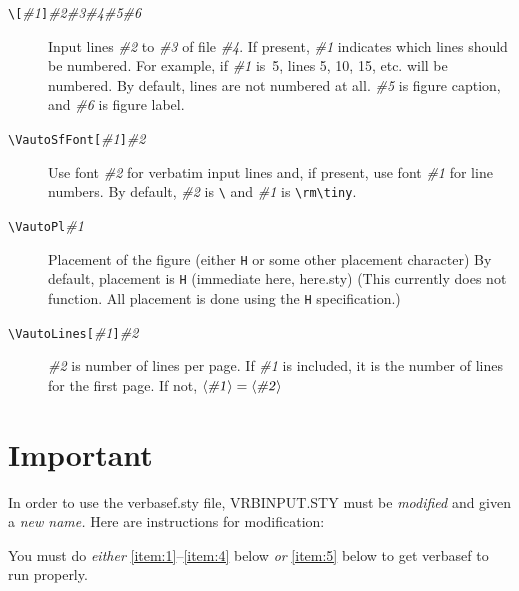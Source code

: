 \documentclass[pagesize=auto]{scrartcl}
\makeatletter
\newcommand*{\pkg}[1]{\textsf{#1}}
\newcommand*{\cs}[1]{\texttt{\textbackslash#1}}
\newcommand*{\cmd}[1]{\cs{\expandafter\@gobble\string#1}}
\newcommand*{\opt}[1]{\texttt{#1}}
\newcommand*{\meta}[1]{\textlangle\textsl{#1}\textrangle}
\newcommand*{\oarg}[1]{\texttt{[}\meta{#1}\texttt{]}}
\makeatother
\begin{document}

\begin{description}
\item[\cmd{\VautoSubF}\oarg{\#1}\meta{\#2}\meta{\#3}\meta{\#4}\meta{\#5}\meta{\#6}]
  Input lines \meta{\#2} to \meta{\#3} of file \meta{\#4}.  If present, \meta{\#1} indicates which lines
  should be numbered.  For example, if \meta{\#1} is~5, lines 5, 10, 15, etc.
  will be numbered.  By default, lines are not numbered at all.
  \meta{\#5} is figure caption, and \meta{\#6} is figure label.

\item[\cmd{VautoSfFont}\oarg{\#1}\meta{\#2}]
  Use font \meta{\#2} for verbatim input lines and, if present, use font \meta{\#1} for
  line numbers.  By default, \meta{\#2} is \cmd{\tt} and \meta{\#1} is \verb+\rm\tiny+.
  
\item[\cmd{VautoPl}\meta{\#1}]
  Placement of the figure (either \opt{H} or some other placement character)
  By default, placement is \opt{H} (immediate here, \pkg{here.sty}) 
  (This currently does not function.  All placement is done using the 
  \opt{H} specification.)

\item[\cmd{VautoLines}\oarg{\#1}{\meta{\#2}}]
  \meta{\#2} is number of lines per page.  If \meta{\#1} is included, it is the number of
  lines for the first page.  If not, $\text{\meta{\#1}} = \text{\meta{\#2}}$
\end{description}


\section{Important}
\label{sec:important}

In order to use the \pkg{verbasef.sty} file, \pkg{VRBINPUT.STY} must be \emph{modified}
and given a \emph{new name.}  Here are instructions for modification:

You must do \emph{either} \ref{item:1}--\ref{item:4} below \emph{or} \ref{item:5} below to get \pkg{verbasef} to run properly.
\end{document}
